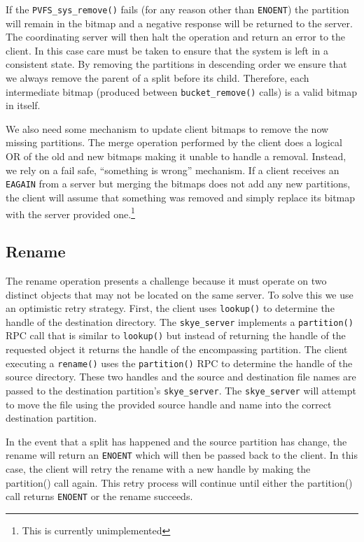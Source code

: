 \documentclass[twocolumn,letterpaper]{article}
\newcommand{\code}[1]{\texttt{#1}}
\begin{document}
If the \code{PVFS\_\-sys\_\-remove()} fails (for any reason other than \code{ENOENT}) the partition
will remain in the bitmap and a negative response will be returned to the
server.  The coordinating server will then halt the operation and return an
error to the client.  In this case care must be taken to ensure that the system
is left in a consistent state.  By removing the partitions in descending order
we ensure that we always remove the parent of a split before its child.
Therefore, each intermediate bitmap (produced between
\code{bucket\_\-remove()} calls) is
a valid bitmap in itself.

We also need some mechanism to update client bitmaps to remove the now missing
partitions.  The merge operation performed by the client does a logical
OR of the old and new bitmaps making it unable to handle a removal.  Instead, we
rely on a fail safe, ``something is wrong'' mechanism.  If a client receives an
\code{EAGAIN} from a server but merging the bitmaps does not add any new partitions,
the client will assume that something was removed and simply replace its bitmap
with the server provided one.\footnote{This is currently unimplemented}

\subsection{Rename}
The rename operation presents a challenge because it must operate on two distinct
objects that may not be located on the same server.  To solve this we use an
optimistic retry strategy.  First, the client uses \code{lookup()} to determine the
handle of the destination directory.  The \code{skye\_\-server} implements a
\code{partition()}
RPC call that is similar to \code{lookup()} but instead of returning the handle of the
requested object it returns the handle of the encompassing partition.  The
client executing a \code{rename()} uses the \code{partition()} RPC to determine the handle of
the source directory.  These two handles and the source and destination file
names are passed to the destination partition's \code{skye\_\-server}.  The \code{skye\_\-server}
will attempt to move the file using the provided source handle and name into the
correct destination partition.  

In the event that a split has happened and the source partition has change, the
rename will return an \code{ENOENT} which will then be passed back to the client.  In
this case, the client will retry the rename with a new handle by making the
partition() call again.  This retry process will continue until either the
partition() call returns \code{ENOENT} or the rename succeeds.  
\end{document}
